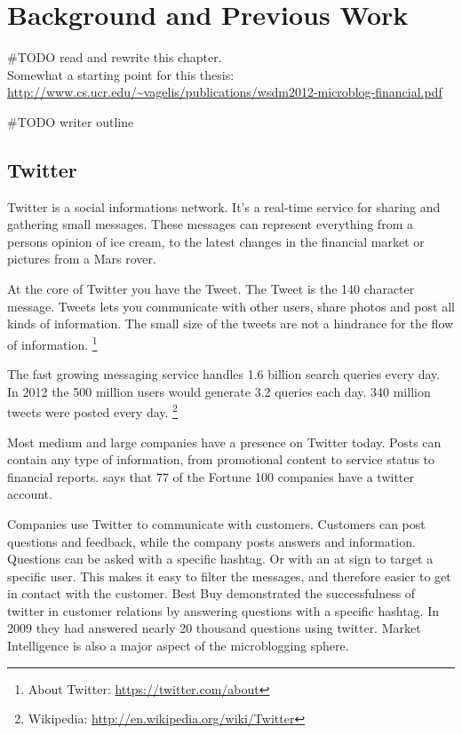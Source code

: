 \chapter{Background and Previous Work}\label{previous_work}
#TODO read and rewrite this chapter. \\

Somewhat a starting point for this thesis:
\url{http://www.cs.ucr.edu/~vagelis/publications/wsdm2012-microblog-financial.pdf}

#TODO writer outline 

\section{Twitter}
Twitter is a social informations network. 
It's a real-time service for sharing and gathering small messages. These
messages can represent everything from a persons opinion of ice cream, to the
latest changes in the financial market or pictures from a Mars rover. 

At the core of Twitter you have the Tweet. The Tweet is the 140 character
message. 
Tweets lets you communicate with other users, share photos and post all kinds of
information. The small size of the tweets are not a hindrance for the flow of
information. 
\footnote{About Twitter: \url{https://twitter.com/about}}

The fast growing messaging service handles 1.6 billion search queries every day.
In 2012 the 500 million users would generate 3.2 queries each day. 340 million tweets were posted every day. 
\footnote{Wikipedia: \url{http://en.wikipedia.org/wiki/Twitter}} 

Most medium and large companies have a presence on Twitter today. Posts can contain
any type of information, from promotional content to service status to
financial reports. \cite[p8]{annikajubbega11:twitter_driver_stock_price} says
that 77 of the Fortune 100 companies have a twitter account. 

Companies use Twitter to communicate with customers. Customers can post
questions and feedback, while the company posts answers and information.
Questions can be asked with a specific hashtag. Or with an at sign to target a
specific user. This makes it easy to filter the messages, and therefore easier
to get in contact with the customer. Best Buy demonstrated the successfulness of
twitter in customer relations by answering questions with a specific hashtag. In
2009 they had answered nearly 20 thousand questions using twitter.
\cite[p1]{Li2013206} Market Intelligence is also a major aspect of the
microblogging sphere.

